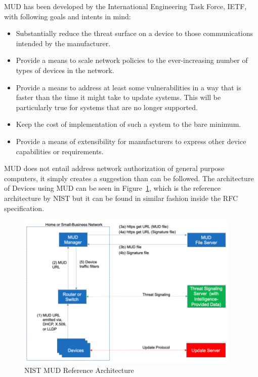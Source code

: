 MUD has been developed by the International Engineering Task Force, IETF, with following goals and intents in mind:
\cite{rfc8520-mud}
\begin{itemize}
	\item Substantially reduce the threat surface on a device to those communications intended by the manufacturer.
	\item Provide a means to scale network policies to the ever-increasing number of types of devices in the network.
	\item Provide a means to address at least some vulnerabilities in a way that is faster than the time it might
	      take to update systems. This will be particularly true for systems that are no longer supported.
	\item Keep the cost of implementation of such a system to the bare minimum.
	\item Provide a means of extensibility for manufacturers to express other device capabilities or requirements.
\end{itemize}

MUD does not entail address network authorization of general purpose computers, it simply creates a suggestion than can
be followed.
The architecture of Devices using MUD can be seen in Figure~\ref{fig:NIST MUD Reference Architecture}, which is the
reference architecture by NIST \cite{dodson2021securing} but it can be found in similar fashion inside the RFC
specification.

\begin{figure}
	\begin{center}
		\includegraphics[width=0.95\textwidth]{figures/nist-mud-arch.png}
	\end{center}
	\caption{NIST MUD Reference Architecture}
	\label{fig:NIST MUD Reference Architecture}
\end{figure}

